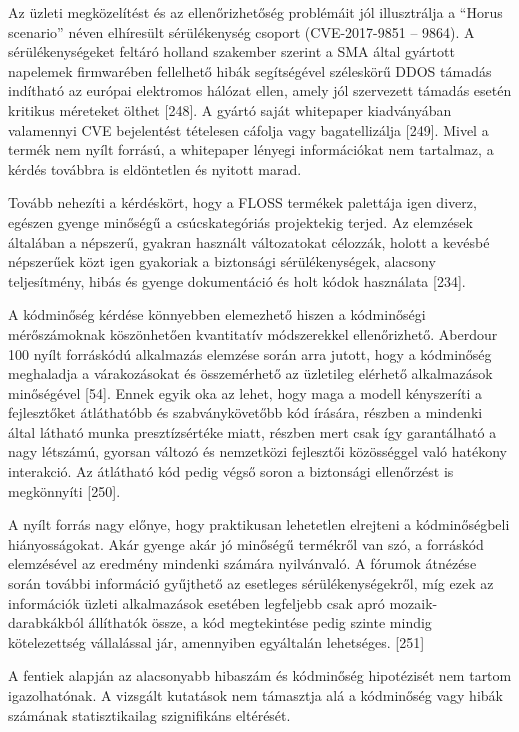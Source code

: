 \documentclass[12pt,magyar,a4paper,oneside]{scrreprt}
\begin{document}
Az üzleti megközelítést és az ellenőrizhetőség problémáit jól
illusztrálja a ``Horus scenario'' néven elhíresült sérülékenység csoport
(CVE-2017-9851 -- 9864). A sérülékenységeket feltáró holland szakember
szerint a SMA által gyártott napelemek firmwarében fellelhető hibák
segítségével széleskörű DDOS támadás indítható az európai elektromos
hálózat ellen, amely jól szervezett támadás esetén kritikus méreteket
ölthet {[}248{]}. A gyártó saját whitepaper kiadványában valamennyi CVE
bejelentést tételesen cáfolja vagy bagatellizálja {[}249{]}. Mivel a
termék nem nyílt forrású, a whitepaper lényegi információkat nem
tartalmaz, a kérdés továbbra is eldöntetlen és nyitott marad.

Tovább nehezíti a kérdéskört, hogy a FLOSS termékek palettája igen
diverz, egészen gyenge minőségű a csúcskategóriás projektekig terjed. Az
elemzések általában a népszerű, gyakran használt változatokat célozzák,
holott a kevésbé népszerűek közt igen gyakoriak a biztonsági
sérülékenységek, alacsony teljesítmény, hibás és gyenge dokumentáció és
holt kódok használata {[}234{]}.

A kódminőség kérdése könnyebben elemezhető hiszen a kódminőségi
mérőszámoknak köszönhetően kvantitatív módszerekkel ellenőrizhető.
Aberdour 100 nyílt forráskódú alkalmazás elemzése során arra jutott,
hogy a kódminőség meghaladja a várakozásokat és összemérhető az
üzletileg elérhető alkalmazások minőségével {[}54{]}. Ennek egyik oka az
lehet, hogy maga a modell kényszeríti a fejlesztőket átláthatóbb és
szabványkövetőbb kód írására, részben a mindenki által látható munka
presztízsértéke miatt, részben mert csak így garantálható a nagy
létszámú, gyorsan változó és nemzetközi fejlesztői közösséggel való
hatékony interakció. Az átlátható kód pedig végső soron a biztonsági
ellenőrzést is megkönnyíti {[}250{]}.

A nyílt forrás nagy előnye, hogy praktikusan lehetetlen elrejteni a
kódminőségbeli hiányosságokat. Akár gyenge akár jó minőségű termékről
van szó, a forráskód elemzésével az eredmény mindenki számára
nyilvánvaló. A fórumok átnézése során további információ gyűjthető az
esetleges sérülékenységekről, míg ezek az információk üzleti
alkalmazások esetében legfeljebb csak apró mozaik-darabkákból állíthatók
össze, a kód megtekintése pedig szinte mindig kötelezettség vállalással
jár, amennyiben egyáltalán lehetséges. {[}251{]}

A fentiek alapján az alacsonyabb hibaszám és kódminőség hipotézisét nem
tartom igazolhatónak. A vizsgált kutatások nem támasztja alá a
kódminőség vagy hibák számának statisztikailag szignifikáns eltérését.
\end{document}
